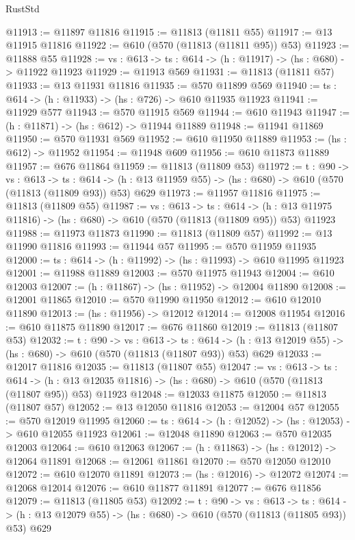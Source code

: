 \begin{lexlean}{RustStd}
\begin{coremodule}
@11913 := @11897 @11816
@11915 := @11813 (@11811 @55)
@11917 := @13 @11915 @11816
@11922 := @610 (@570 (@11813 (@11811 @95)) @53)
@11923 := @11888 @55
@11928 := {vs : @613} -> {ts : @614} -> (h : @11917) -> (hs : @680) -> @11922 @11923
@11929 := @11913 @569
@11931 := @11813 (@11811 @57)
@11933 := @13 @11931 @11816
@11935 := @570 @11899 @569
@11940 := {ts : @614} -> (h : @11933) -> (hs : @726) -> @610 @11935 @11923
@11941 := @11929 @577
@11943 := @570 @11915 @569
@11944 := @610 @11943
@11947 := (h : @11871) -> (hs : @612) -> @11944 @11889
@11948 := @11941 @11869
@11950 := @570 @11931 @569
@11952 := @610 @11950 @11889
@11953 := (hs : @612) -> @11952
@11954 := @11948 @609
@11956 := @610 @11873 @11889
@11957 := @676 @11864
@11959 := @11813 (@11809 @53)
@11972 := {t : @90} ->
  {vs : @613} ->
  {ts : @614} -> (h : @13 @11959 @55) -> (hs : @680) -> @610 (@570 (@11813 (@11809 @93)) @53) @629
@11973 := @11957 @11816
@11975 := @11813 (@11809 @55)
@11987 := {vs : @613} ->
  {ts : @614} ->
  (h : @13 @11975 @11816) -> (hs : @680) -> @610 (@570 (@11813 (@11809 @95)) @53) @11923
@11988 := @11973 @11873
@11990 := @11813 (@11809 @57)
@11992 := @13 @11990 @11816
@11993 := @11944 @57
@11995 := @570 @11959 @11935
@12000 := {ts : @614} -> (h : @11992) -> (hs : @11993) -> @610 @11995 @11923
@12001 := @11988 @11889
@12003 := @570 @11975 @11943
@12004 := @610 @12003
@12007 := (h : @11867) -> (hs : @11952) -> @12004 @11890
@12008 := @12001 @11865
@12010 := @570 @11990 @11950
@12012 := @610 @12010 @11890
@12013 := (hs : @11956) -> @12012
@12014 := @12008 @11954
@12016 := @610 @11875 @11890
@12017 := @676 @11860
@12019 := @11813 (@11807 @53)
@12032 := {t : @90} ->
  {vs : @613} ->
  {ts : @614} -> (h : @13 @12019 @55) -> (hs : @680) -> @610 (@570 (@11813 (@11807 @93)) @53) @629
@12033 := @12017 @11816
@12035 := @11813 (@11807 @55)
@12047 := {vs : @613} ->
  {ts : @614} ->
  (h : @13 @12035 @11816) -> (hs : @680) -> @610 (@570 (@11813 (@11807 @95)) @53) @11923
@12048 := @12033 @11875
@12050 := @11813 (@11807 @57)
@12052 := @13 @12050 @11816
@12053 := @12004 @57
@12055 := @570 @12019 @11995
@12060 := {ts : @614} -> (h : @12052) -> (hs : @12053) -> @610 @12055 @11923
@12061 := @12048 @11890
@12063 := @570 @12035 @12003
@12064 := @610 @12063
@12067 := (h : @11863) -> (hs : @12012) -> @12064 @11891
@12068 := @12061 @11861
@12070 := @570 @12050 @12010
@12072 := @610 @12070 @11891
@12073 := (hs : @12016) -> @12072
@12074 := @12068 @12014
@12076 := @610 @11877 @11891
@12077 := @676 @11856
@12079 := @11813 (@11805 @53)
@12092 := {t : @90} ->
  {vs : @613} ->
  {ts : @614} -> (h : @13 @12079 @55) -> (hs : @680) -> @610 (@570 (@11813 (@11805 @93)) @53) @629

\end{coremodule}
\end{lexlean}
